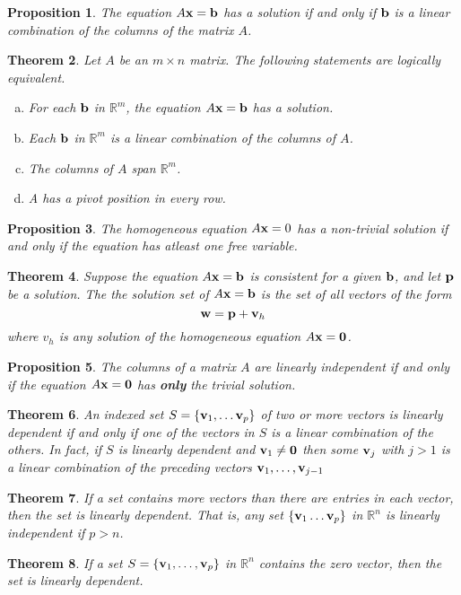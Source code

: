 \documentclass[12pt,letterpaper]{article}
\newcommand{\rr}{\mathbb R}     %
\renewcommand{\v}{{\bf v}}
\newcommand{\x}{{\bf x}}
\renewcommand{\b}{{\bf b}}
\newcommand{\0}{{\bf 0}}
\theoremstyle{plain}
\newtheorem{theorem}{Theorem}
\newtheorem{prop}[theorem]{Proposition}
\theoremstyle{definition}
\begin{document}
\begin{prop} The equation $A\x=\b$ has a solution if and only if $\b$ is a linear combination of the columns of the matrix $A$. 
\end{prop}
\begin{theorem}\label{span/onto}Let $A$ be an $m\times n$ matrix. The following statements are logically equivalent. 
\begin{enumerate}[(a)]
\item For each $\b$ in $\rr^m$, the equation $A\x=\b$ has a solution.
\item Each $\b$ in $\rr^m$ is a linear combination of the columns of $A$.
\item The columns of $A$ span $\rr^m$. 
\item A has a pivot position in every row.
\end{enumerate}
\end{theorem}
\begin{prop}\label{trivial/1to1}The homogeneous equation $A\x=0$ has a non-trivial solution if and only if the equation has atleast one free variable.
\end{prop}
\begin{theorem}
Suppose the equation $A\x=\b$ is consistent for a given $\b$, and let ${\bf p}$ be a solution. The the solution set of $A\x=\b$ is the set of all vectors of the form 
\[{\bf w}={\bf p}+\v_h\]
where $v_h$ is any solution of the homogeneous equation $A\x=\0$. 
\end{theorem}
\begin{prop}The columns of a matrix $A$ are linearly independent if and only if the equation $A\x=\0$ has {\bf only} the trivial solution. 
\end{prop}
\begin{theorem}An indexed set $S=\{\v_1,\ldots \v_p\}$ of two or more vectors is linearly dependent if and only if one of the vectors in $S$ is a linear combination of the others. In fact, if $S$ is linearly dependent and $\v_1\neq \0$ then some $\v_j$ with $j>1$ is a linear combination of the preceding vectors $\v_1,\ldots, \v_{j-1}$
\end{theorem}
\begin{theorem}If a set contains more vectors than there are entries in each vector, then the set is linearly dependent. That is, any set $\{\v_1 \ldots \v_p\}$ in $\mathbb{R}^n$ is linearly independent if $p>n$. 
\end{theorem}
\begin{theorem} If a set $S=\{\v_1,\ldots, \v_p\}$ in $\mathbb{R}^n$ contains the zero vector, then the set is linearly dependent.
\end{theorem}
\end{document}
